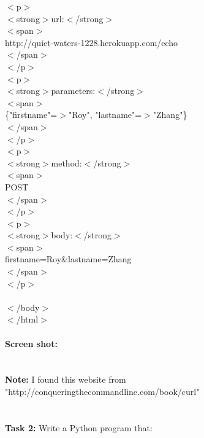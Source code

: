 \documentclass{article}
\begin{document}
			  $<$p$>$\\
			\indent\indent
			    $<$strong$>$url:$<$/strong$>$\\
			\indent\indent
			    $<$span$>$\\
			\indent\indent\indent
			      http://quiet-waters-1228.herokuapp.com/echo\\
			\indent\indent
			    $<$/span$>$\\
			\indent
			  $<$/p$>$\\
			\indent
			  $<$p$>$\\
			\indent\indent
			    $<$strong$>$parameters:$<$/strong$>$\\
			\indent\indent
			    $<$span$>$\\
			\indent\indent\indent
			      \{"firstname"=$>$"Roy", "lastname"=$>$"Zhang"\}\\
			\indent\indent
			    $<$/span$>$\\
			\indent
			  $<$/p$>$\\
			\indent
			  $<$p$>$\\
			\indent\indent
			    $<$strong$>$method:$<$/strong$>$\\
			\indent\indent
			    $<$span$>$\\
			\indent\indent\indent
			      POST\\
			\indent\indent
			    $<$/span$>$\\
			\indent
			  $<$/p$>$\\
			\indent
			  $<$p$>$\\
			\indent\indent
			    $<$strong$>$body:$<$/strong$>$\\
			\indent\indent
			    $<$span$>$\\
			\indent\indent\indent
			      firstname=Roy\&lastname=Zhang\\
			\indent\indent
			    $<$/span$>$\\
			\indent
			  $<$/p$>$\\\\
			$<$/body$>$\\
			$<$/html$>$\\\\
		\textbf{Screen shot:}\\
		\\\\
		\textbf{Note:} I found this website from "http://conqueringthecommandline.com/book/curl"\\\\\\
		\textbf{Task 2:} Write a Python program that:\\
\end{document}
